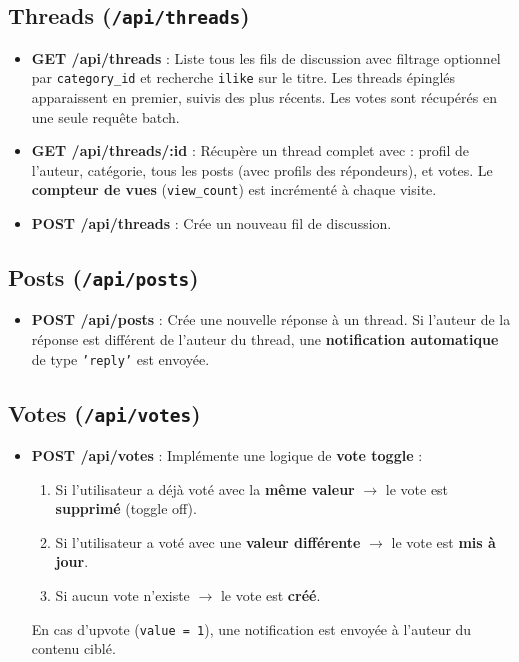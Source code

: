 \documentclass[12pt, a4paper]{report}
\begin{document}
\subsection{Threads (\texttt{/api/threads})}

\begin{itemize}
    \item \textbf{GET /api/threads} : Liste tous les fils de discussion avec filtrage optionnel par \texttt{category\_id} et recherche \texttt{ilike} sur le titre. Les threads épinglés apparaissent en premier, suivis des plus récents. Les votes sont récupérés en une seule requête batch.
    \item \textbf{GET /api/threads/:id} : Récupère un thread complet avec : profil de l'auteur, catégorie, tous les posts (avec profils des répondeurs), et votes. Le \textbf{compteur de vues} (\texttt{view\_count}) est incrémenté à chaque visite.
    \item \textbf{POST /api/threads} : Crée un nouveau fil de discussion.
\end{itemize}

\subsection{Posts (\texttt{/api/posts})}

\begin{itemize}
    \item \textbf{POST /api/posts} : Crée une nouvelle réponse à un thread. Si l'auteur de la réponse est différent de l'auteur du thread, une \textbf{notification automatique} de type \texttt{'reply'} est envoyée.
\end{itemize}

\subsection{Votes (\texttt{/api/votes})}

\begin{itemize}
    \item \textbf{POST /api/votes} : Implémente une logique de \textbf{vote toggle} :
    \begin{enumerate}
        \item Si l'utilisateur a déjà voté avec la \textbf{même valeur} $\rightarrow$ le vote est \textbf{supprimé} (toggle off).
        \item Si l'utilisateur a voté avec une \textbf{valeur différente} $\rightarrow$ le vote est \textbf{mis à jour}.
        \item Si aucun vote n'existe $\rightarrow$ le vote est \textbf{créé}.
    \end{enumerate}
    En cas d'upvote (\texttt{value = 1}), une notification est envoyée à l'auteur du contenu ciblé.
\end{itemize}
\end{document}
